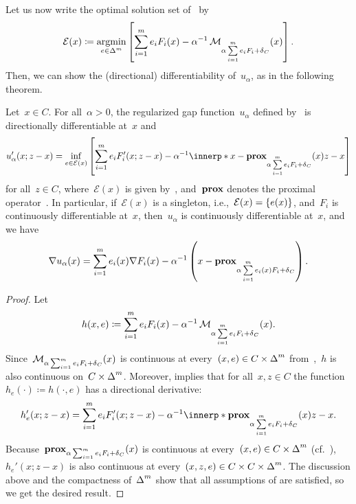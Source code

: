 \documentclass[../../main]{subfiles}
\begin{document}
Let us now write the optimal solution set of~ by
\begin{equation} \label{eq:Lambda}
    \mathcal{E}(x) \coloneqq \argmin_{e \in \simplex^m} \left[ \sum_{i = 1}^{m} e_i F_i(x) - \alpha^{-1} \envelope_{\alpha \sum\limits_{i = 1}^{m} e_i F_i + \indicator_C} (x) \right]
.\end{equation} 
Then, we can show the (directional) differentiability of~$u_\alpha$, as in the following theorem.
\begin{theorem} 
    Let~$x \in C$.
    For all~$\alpha > 0$, the regularized gap function~$u_\alpha$ defined by~ is directionally differentiable at~$x$ and
    \begin{equation}
        u_\alpha'(x; z - x) = \inf_{e \in \mathcal{E}(x)} \left[ \sum_{i = 1}^{m} e_i F_i'(x; z - x) - \alpha^{-1} \innerp*{x - \prox_{\alpha \sum\limits_{i = 1}^{m} e_i F_i + \indicator_C}(x)}{z - x} \right] 
    \end{equation} 
    for all~$z \in C$, where~$\mathcal{E}(x)$ is given by~, and~$\prox$ denotes the proximal operator~.
    In particular, if~$\mathcal{E}(x)$ is a singleton, i.e.,~$\mathcal{E}(x) = \set*{e(x)}$, and~$F_i$ is continuously differentiable at~$x$, then~$u_\alpha$ is continuously differentiable at~$x$, and we have
    \begin{equation}
        \nabla u_\alpha(x) = \sum_{i = 1}^{m} e_i(x) \nabla F_i(x) - \alpha^{-1} \left( x - \prox_{\alpha \sum\limits_{i = 1}^{m} e_i(x) F_i + \indicator_C} \right) 
    .\end{equation} 
\end{theorem}
\begin{proof}
    Let
    \begin{equation}
        h(x, e) \coloneqq \sum_{i = 1}^{m} e_i F_i(x) - \alpha^{-1} \envelope_{\alpha \sum\limits_{i = 1}^{m} e_i F_i + \indicator_C} (x)
    .\end{equation} 
    Since~$\envelope_{\alpha \sum_{i = 1}^{m} e_i F_i + \indicator_C} (x)$ is continuous at every~$(x, e) \in C \times \simplex^m$ from~\cite[Theorem~7.37]{Rockafellar1998},~$h$ is also continuous on~$C \times \simplex^m$.
    Moreover,  implies that for all~$x, z \in C$ the function~$h_e(\cdot) \coloneqq h(\cdot, e)$ has a directional derivative:
    \begin{equation}
        h_e'(x; z - x) = \sum_{i = 1}^{m} e_i F_i'(x; z - x) - \alpha^{-1} \innerp*{\prox_{\alpha \sum\limits_{i = 1}^{m} e_i F_i + \indicator_C}(x)}{z - x}
    .\end{equation} 
    Because~$\prox_{\alpha \sum_{i = 1}^{m} e_i F_i + \indicator_C} (x)$ is continuous at every~$(x, e) \in C \times \simplex^m$ (cf.~\cite[Exercise~7.38]{Rockafellar1998}),~$h_e'(x; z - x)$ is also continuous at every~$(x, z, e) \in C \times C \times \simplex^m$.
    The discussion above and the compactness of~$\simplex^m$ show that all assumptions of  are satisfied, so we get the desired result.
\end{proof}
\end{document}
